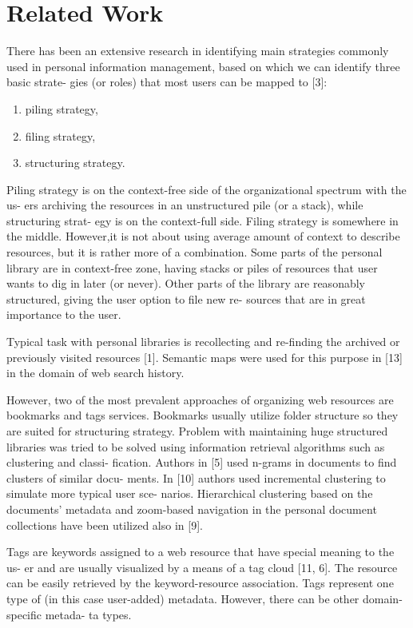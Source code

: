 \documentclass{llncs}
\begin{document}
\section{Related Work}
There has been an extensive research in identifying main strategies commonly used in personal information management, based on which we can identify three basic strate- gies (or roles) that most users can be mapped to [3]:

\begin{enumerate}
\item piling strategy,
\item filing strategy,
\item structuring strategy.

\end{enumerate}

Piling strategy is on the context-free side of the organizational spectrum with the us- ers archiving the resources in an unstructured pile (or a stack), while structuring strat- egy is on the context-full side. Filing strategy is somewhere in the middle. However,it is not about using average amount of context to describe resources, but it is rather more of a combination. Some parts of the personal library are in context-free zone, having stacks or piles of resources that user wants to dig in later (or never). Other parts of the library are reasonably structured, giving the user option to file new re- sources that are in great importance to the user.

Typical task with personal libraries is recollecting and re-finding the archived or previously visited resources [1]. Semantic maps were used for this purpose in [13] in the domain of web search history.

However, two of the most prevalent approaches of organizing web resources are bookmarks and tags services. Bookmarks usually utilize folder structure so they are suited for structuring strategy. Problem with maintaining huge structured libraries was tried to be solved using information retrieval algorithms such as clustering and classi- fication. Authors in [5] used n-grams in documents to find clusters of similar docu- ments. In [10] authors used incremental clustering to simulate more typical user sce- narios. Hierarchical clustering based on the documents’ metadata and zoom-based navigation in the personal document collections have been utilized also in [9].

Tags are keywords assigned to a web resource that have special meaning to the us- er and are usually visualized by a means of a tag cloud [11, 6]. The resource can be easily retrieved by the keyword-resource association. Tags represent one type of (in this case user-added) metadata. However, there can be other domain-specific metada- ta types.
\end{document}
